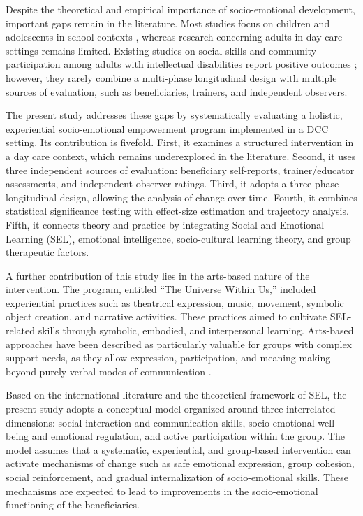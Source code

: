\documentclass[12pt,a4paper]{article}
\begin{document}
Despite the theoretical and empirical importance of socio-emotional development, important gaps remain in the literature. Most studies focus on children and adolescents in school contexts \citep{durlak2011,humphrey2013,oberle2019}, whereas research concerning adults in day care settings remains limited. Existing studies on social skills and community participation among adults with intellectual disabilities report positive outcomes \citep{hall2009,verdonschot2009}; however, they rarely combine a multi-phase longitudinal design with multiple sources of evaluation, such as beneficiaries, trainers, and independent observers.

The present study addresses these gaps by systematically evaluating a holistic, experiential socio-emotional empowerment program implemented in a DCC setting. Its contribution is fivefold. First, it examines a structured intervention in a day care context, which remains underexplored in the literature. Second, it uses three independent sources of evaluation: beneficiary self-reports, trainer/educator assessments, and independent observer ratings. Third, it adopts a three-phase longitudinal design, allowing the analysis of change over time. Fourth, it combines statistical significance testing with effect-size estimation and trajectory analysis. Fifth, it connects theory and practice by integrating Social and Emotional Learning (SEL), emotional intelligence, socio-cultural learning theory, and group therapeutic factors.

A further contribution of this study lies in the arts-based nature of the intervention. The program, entitled ``The Universe Within Us,'' included experiential practices such as theatrical expression, music, movement, symbolic object creation, and narrative activities. These practices aimed to cultivate SEL-related skills through symbolic, embodied, and interpersonal learning. Arts-based approaches have been described as particularly valuable for groups with complex support needs, as they allow expression, participation, and meaning-making beyond purely verbal modes of communication \citep{leavy2015,stickley2018}.

Based on the international literature and the theoretical framework of SEL, the present study adopts a conceptual model organized around three interrelated dimensions: social interaction and communication skills, socio-emotional well-being and emotional regulation, and active participation within the group. The model assumes that a systematic, experiential, and group-based intervention can activate mechanisms of change such as safe emotional expression, group cohesion, social reinforcement, and gradual internalization of socio-emotional skills. These mechanisms are expected to lead to improvements in the socio-emotional functioning of the beneficiaries.
\end{document}

